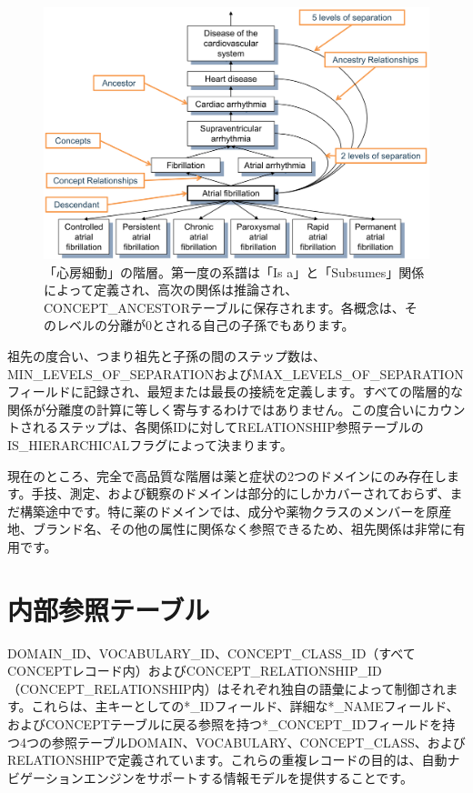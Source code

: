 \documentclass[
  11pt]{book}
\theoremstyle{definition}
\theoremstyle{definition}
\theoremstyle{definition}
\theoremstyle{definition}
\theoremstyle{remark}
\begin{document}
\begin{figure}

{\centering \includegraphics[width=1\linewidth]{images/StandardizedVocabularies/conceptAncestor} 

}

\caption{「心房細動」の階層。第一度の系譜は「Is a」と「Subsumes」関係によって定義され、高次の関係は推論され、CONCEPT\_ANCESTORテーブルに保存されます。各概念は、そのレベルの分離が0とされる自己の子孫でもあります。 }\label{fig:conceptAncestor}
\end{figure}

祖先の度合い、つまり祖先と子孫の間のステップ数は、MIN\_LEVELS\_OF\_SEPARATIONおよびMAX\_LEVELS\_OF\_SEPARATIONフィールドに記録され、最短または最長の接続を定義します。すべての階層的な関係が分離度の計算に等しく寄与するわけではありません。この度合いにカウントされるステップは、各関係IDに対してRELATIONSHIP参照テーブルのIS\_HIERARCHICALフラグによって決まります。

現在のところ、完全で高品質な階層は薬と症状の2つのドメインにのみ存在します。手技、測定、および観察のドメインは部分的にしかカバーされておらず、まだ構築途中です。特に薬のドメインでは、成分や薬物クラスのメンバーを原産地、ブランド名、その他の属性に関係なく参照できるため、祖先関係は非常に有用です。

\section{内部参照テーブル}\label{ux5185ux90e8ux53c2ux7167ux30c6ux30fcux30d6ux30eb}

DOMAIN\_ID、VOCABULARY\_ID、CONCEPT\_CLASS\_ID（すべてCONCEPTレコード内）およびCONCEPT\_RELATIONSHIP\_ID（CONCEPT\_RELATIONSHIP内）はそれぞれ独自の語彙によって制御されます。これらは、主キーとしての*\_IDフィールド、詳細な*\_NAMEフィールド、およびCONCEPTテーブルに戻る参照を持つ*\_CONCEPT\_IDフィールドを持つ4つの参照テーブルDOMAIN、VOCABULARY、CONCEPT\_CLASS、およびRELATIONSHIPで定義されています。これらの重複レコードの目的は、自動ナビゲーションエンジンをサポートする情報モデルを提供することです。
\end{document}
